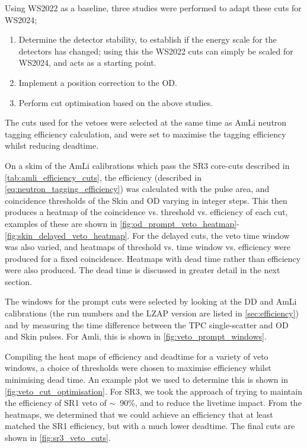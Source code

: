 Using WS2022 as a baseline, three studies were performed to adapt these cuts for WS2024;
\begin{enumerate}
	\item Determine the detector stability, to establish if the energy scale for the detectors has changed; using this the WS2022 cuts can simply be scaled for WS2024, and acts as a starting point.
	\item Implement a position correction to the OD.
	\item Perform cut optimisation based on the above studies.
\end{enumerate}
The cuts used for the vetoes were selected at the same time as AmLi neutron tagging efficiency calculation, and were set to maximise the tagging efficiency whilst reducing deadtime.

On a skim of the AmLi calibrations which pass the SR3 core-cuts described in \autoref{tab:amli_efficiency_cuts}, the efficiency (described in \autoref{eq:neutron_tagging_efficiency}) was calculated with the pulse area, and coincidence thresholds of the Skin and OD varying in integer steps.
This then produces a heatmap of the coincidence vs. threshold vs. efficiency of each cut, examples of these are shown in \autoref{fig:od_prompt_veto_heatmap}-\ref{fig:skin_delayed_veto_heatmap}.
For the delayed cuts, the veto time window was also varied, and heatmaps of threshold vs. time window vs. efficiency were produced for a fixed coincidence. Heatmaps with dead time rather than efficiency were also produced. The dead time is discussed in greater detail in the next section.

The windows for the prompt cuts were selected by looking at the DD and AmLi calibrations (the run numbers and the LZAP version are listed in \autoref{sec:efficiency}) and by measuring the time difference between the TPC single-scatter and OD and Skin pulses.
For Amli, this is shown in \autoref{fig:veto_prompt_windows}.

Compiling the heat maps of efficiency and deadtime for a variety of veto windows, a choice of thresholds were chosen to maximise efficiency whilst minimising dead time.
An example plot we used to determine this is shown in \autoref{fig:veto_cut_optimisation}.
For SR3, we took the approach of trying to maintain the efficiency of SR1 veto of $\sim$~90\%, and to reduce the livetime impact.
From the heatmaps, we determined that we could achieve an efficiency that at least matched the SR1 efficiency, but with a much lower deadtime.
The final cuts are shown in \autoref{fig:sr3_veto_cuts}.

